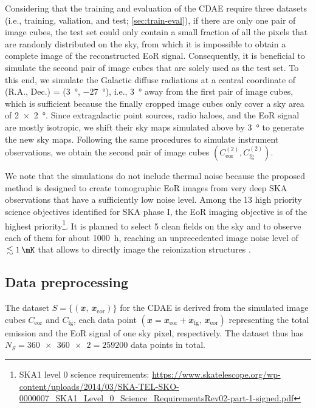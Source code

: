 \documentclass[fleqn,usenatbib]{mnras}
\newcommand{\R}[1]{\mathrm{#1}}
\newcommand{\B}[1]{\mathbfit{#1}}
\newcommand{\editone}[1]{{\leavevmode\color{cyan}#1}}
\begin{document}
\editone{%
Considering that the training and evaluation of the CDAE require three
datasets (i.e., training, valiation, and test; \autoref{sec:train-eval}),
if there are only one pair of image cubes, the test set could only contain
a small fraction of all the pixels that are randonly distributed on the
sky, from which it is impossible to obtain a complete image of the
reconstructed EoR signal.
Consequently, it is beneficial to simulate the second pair of image cubes
that are solely used as the test set.
To this end, we simulate the Galactic diffuse radiations at a central
coordinate of (R.A., Dec\@.) = (\SI{3}{\degree}, \SI{-27}{\degree}), i.e.,
\SI{3}{\degree} away from the first pair of image cubes, which is
sufficient because the finally cropped image cubes only cover a sky area of
\SI{2 x 2}{\degree}.
Since extragalactic point sources, radio haloes, and the EoR signal are
mostly isotropic, we shift their sky maps simulated above by
\SI{3}{\degree} to generate the new sky maps.
Following the same procedures to simulate instrument observations, we
obtain the second pair of image cubes
$\left( C_{\R{eor}}^{(2)}, C_{\R{fg}}^{(2)} \right)$.

We note that the simulations do not include thermal noise because the
proposed method is designed to create tomographic EoR images from very deep
SKA observations that have a sufficiently low noise level.
Among the 13 high priority science objectives identified for SKA phase I,
the EoR imaging objective is of the highest priority\footnote{\raggedright%
  SKA1 level 0 science requirements:
  \url{https://www.skatelescope.org/wp-content/uploads/2014/03/SKA-TEL-SKO-0000007_SKA1_Level_0_Science_RequirementsRev02-part-1-signed.pdf}}.
It is planned to select 5 clean fields on the sky and to observe each of
them for about \SI{1000}{\hour}, reaching an unprecedented image noise
level of $\,\lesssim \SI{1}{\mK}$ that allows to directly image the
reionization structures
\citep[e.g.,][]{mellema2013rev,mellema2015,koopmans2015rev}.
} %


\subsection{Data preprocessing}
\label{sec:preprocessing}

The dataset $S = \{(\B{x}, \,\B{x}_{\R{eor}})\}$ for the CDAE is derived
from the simulated image cubes $C_{\R{eor}}$ and $C_{\R{fg}}$, each data
point $(\B{x} = \B{x}_{\R{eor}} + \B{x}_{\R{fg}}, \,\B{x}_{\R{eor}})$
representing the total emission and the EoR signal of one sky pixel,
respectively.
\editone{%
The dataset thus has $N_S = \num{360x360 x 2} = \num{259200}$
data points in total.}
\end{document}
